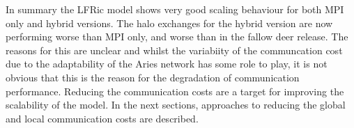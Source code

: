In summary the LFRic model shows very good scaling behaviour for both
MPI only and hybrid versions. The halo exchanges for the hybrid
version are now performing worse than MPI only, and worse than in the
fallow deer release. The reasons for this are unclear and whilst the
variabiity of the communcation cost due to the adaptability of the
Aries network has some role to play, it is not obvious that this is
the reason for the degradation of communication performance. Reducing
the communication costs are a target for improving the scalability of
the model. In the next sections, approaches to reducing the global
and local communication costs are described.